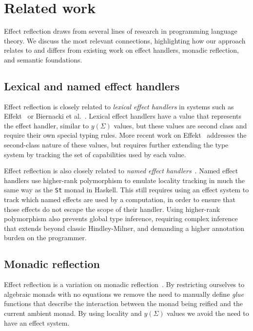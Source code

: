 \documentclass[acmsmall, screen, review, anonymous]{acmart}
\theoremstyle{definition}
\newcommand{\yoneda}[1]{y(#1)}
\begin{document}
\pagebreak
\section{Related work}
\label{sec:related-work}

Effect reflection draws from several lines of research in programming
language theory. We discuss the most relevant connections, highlighting
how our approach relates to and differs from existing work on effect
handlers, monadic reflection, and semantic foundations.

\subsection{Lexical and named effect handlers}

Effect reflection is closely related to \emph{lexical effect handlers}
in systems such as Effekt~\cite{brachthauser2020effects} or Biernacki et
al.~\cite{biernacki2019binders}. Lexical effect handlers have a value
that represents the effect handler, similar to $\yoneda{\Sigma}$ values,
but these values are second class and require their own special typing
rules. More recent work on Effekt~\cite{brachthauser2022effects}
addresses the second-class nature of these values, but requires further
extending the type system by tracking the set of capabilities used by
each value.

Effect reflection is also closely related to \emph{named effect
  handlers}~\cite{xie2022first}. Named effect handlers use higher-rank
polymorphism to emulate locality tracking in much the same way as the
\lstinline[style=haskell]{St} monad in Haskell. This still requires
using an effect system to track which named effects are used by a
computation, in order to ensure that those effects do not escape the
scope of their handler. Using higher-rank polymorphism also prevents
global type inference, requiring complex inference that extends beyond
classic Hindley-Milner, and demanding a higher annotation burden on the
programmer.

\subsection{Monadic reflection}

Effect reflection is a variation on monadic
reflection~\cite{filinski1999representing}. By restricting ourselves to
algebraic monads with no equations we remove the need to manually define
\emph{glue} functions that describe the interaction between the monad
being reified and the current ambient monad. By using locality and
$\yoneda{\Sigma}$ values we avoid the need to have an effect system.
\end{document}
